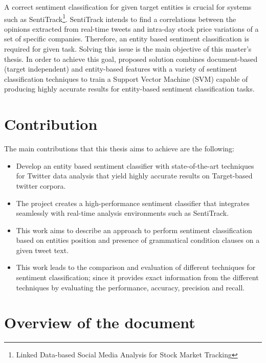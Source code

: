 A correct sentiment classification for given target entities is crucial for systems such as SentiTrack\footnote{Linked Data-based Social Media Analysis for Stock Market Tracking}. SentiTrack intends to find a correlations between the opinions extracted from real-time tweets and intra-day stock price variations of a set of specific companies. Therefore, an entity based sentiment classification is required for given task. Solving this issue is the main objective of this master’s thesis. In order to achieve this goal, proposed solution combines document-based (target independent) and entity-based features with a variety of sentiment classification techniques to train a Support Vector Machine (SVM) capable of producing highly accurate results for entity-based sentiment classification tasks.

\section{Contribution}

The main contributions that this thesis aims to achieve are the following:


\begin{itemize}

\item Develop an entity based sentiment classifier with state-of-the-art techniques for Twitter data analysis that yield highly accurate results on Target-based twitter corpora.

\item The project creates a high-performance sentiment classifier that integrates seamlessly with real-time analysis environments such as SentiTrack.

\item This work aims to describe an approach to perform sentiment classification based on entities position and presence of grammatical condition clauses on a given tweet text.

\item This work leads to the comparison and evaluation of different techniques for sentiment classification; since it provides exact information from the different techniques by evaluating the performance, accuracy, precision and recall.

\end{itemize}

\section{Overview of the document}

